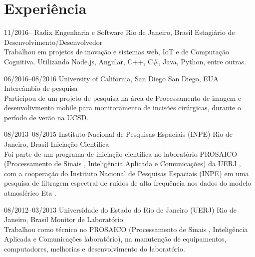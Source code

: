 \documentclass[]{friggeri-cv} %
\begin{document}
\section{Experiência}

\begin{entrylist}



\entry
{11/2016--}
{\hspace{.15cm} Radix Engenharia e Software}
{Rio de Janeiro, Brasil}
{Estagiário de Desenvolvimento/Desenvolvedor \\
Trabalhou em projetos de inovação e sistemas web, IoT e de Computação Cognitiva. Utilizando Node.js, Angular, C++, C\#, Java, Python, entre outras.}

\entry
{06/2016--08/2016}
{\hspace{.15cm} University of California, San Diego}
{San Diego, EUA}
{Intercâmbio de pesquisa \\
Participou de um projeto de pesquisa na área de Processamento de imagem e desenvolivmento mobile para monitoramento de incisões cirúrgicas, durante o período de verão na UCSD.}

\entry
{08/2013--08/2015}
{\hspace{.15cm}Instituto Nacional de Pesquisas Espaciais (INPE)}
{Rio de Janeiro, Brasil}
{Iniciação Científica \\
Foi parte de um programa de iniciação científica no laboratório PROSAICO (Processamento de Sinais , Inteligência Aplicada e Comunicações) da UERJ , com a cooperação do Instituto Nacional de Pesquisas Espaciais (INPE) em uma pesquisa de filtragem espectral de ruídos de alta frequência nos dados do modelo atmosférico Eta .}

\end{entrylist}

\begin{entrylist}
\entry
{08/2012--03/2013}
{\hspace{.15cm}Universidade do Estado do Rio de Janeiro (UERJ)}
{Rio de Janeiro, Brasil}
{Monitor de  Laboratório \\
Trabalhou como técnico no PROSAICO (Processamento de Sinais , Inteligência Aplicada e Comunicações laboratório), na manutenção de equipamentos, computadores, melhorias e desenvolvimento do laboratório.}

\end{entrylist}

\vspace{1cm}
\end{document}
